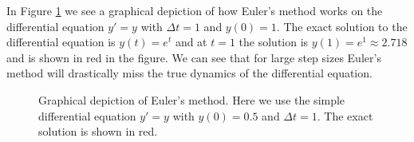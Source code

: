In Figure \ref{fig:Euler_graphical} we see a graphical depiction of how Euler's method
works on the differential equation $y' = y$ with $\Delta t = 1$ and $y(0) = 1$.  The exact
solution to the differential equation is $y(t) = e^t$ and at $t=1$ the solution is $y(1) =
e^1 \approx 2.718$ and is shown in red in the figure. We can see that for large step sizes
Euler's method will drastically miss the true dynamics of the differential equation.

\begin{figure}[ht!]
    \begin{center}
    \end{center}
    \caption{Graphical depiction of Euler's method.  Here we use the simple differential equation
$y'=y$ with $y(0) = 0.5$ and $\Delta t = 1$.  The exact solution is shown in red.}
    \label{fig:Euler_graphical}
\end{figure}



